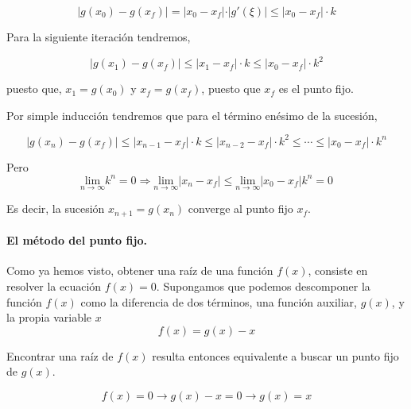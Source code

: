 \begin{equation*}
\vert g(x_0)-g(x_f) \vert =\vert x_0-x_f \vert \cdot \vert g'(\xi) \vert \leq \vert x_0-x_f \vert \cdot k 
\end{equation*}

Para la siguiente iteración tendremos,

\begin{equation*}
\vert g(x_1)-g(x_f) \vert \leq \vert x_1-x_f \vert \cdot k \leq \vert x_0-x_f \vert \cdot k^2 
\end{equation*}

puesto que,  $x_1=g(x_0)$ y $x_f = g(x_f)$, puesto que $x_f$ es el punto fijo. 

Por simple inducción tendremos que para el término enésimo de la sucesión,

\begin{equation*}
\vert g(x_n)-g(x_f) \vert \leq \vert x_{n-1}-x_f \vert \cdot k \leq \vert x_{n-2}-x_f \vert \cdot k^2 \leq \cdots \leq  \vert x_0-x_f \vert \cdot k^n 
\end{equation*}

Pero
\begin{equation*}
\underset{n\rightarrow \infty}{\text{lim}}k^n=0 \Rightarrow \underset{n\rightarrow \infty}{\text{lim}} \vert x_n-x_f \vert \leq \underset{n\rightarrow \infty}{\text{lim}}\vert x_0-x_f \vert k^n =0
\end{equation*} 

Es decir, la sucesión  $x_{n+1}=g(x_n)$ converge al punto fijo $x_f$.


\paragraph{El método del punto fijo.} Como ya hemos visto, obtener una raíz de una función $f(x)$, consiste en resolver la ecuación $f(x)=0$. Supongamos que podemos descomponer la función $f(x)$ como la diferencia de dos términos, una función auxiliar, $g(x)$, y la propia variable $x$
\begin{equation*}
f(x)=g(x)-x
\end{equation*}

Encontrar una raíz de $f(x)$ resulta entonces equivalente a buscar un punto fijo de $g(x)$. 

\begin{equation*}
f(x)=0 \rightarrow g(x)-x=0 \rightarrow g(x)=x
\end{equation*}

